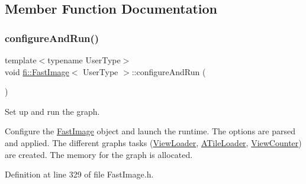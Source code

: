 \subsection{Member Function Documentation}
\mbox{\label{classfi_1_1FastImage_aa2ae5e5498f57462abd876108a55475c}} 
\subsubsection{\texorpdfstring{configure\+And\+Run()}{configureAndRun()}}
{\footnotesize\ttfamily template$<$typename User\+Type$>$ \\
void \hyperlink{classfi_1_1FastImage}{fi\+::\+Fast\+Image}$<$ User\+Type $>$\+::configure\+And\+Run (\begin{DoxyParamCaption}{ }\end{DoxyParamCaption})\hspace{0.3cm}{\ttfamily [inline]}}



Set up and run the graph. 

Configure the \hyperlink{classfi_1_1FastImage}{Fast\+Image} object and launch the runtime. The options are parsed and applied. The different graph\textquotesingle{}s tasks (\hyperlink{classfi_1_1ViewLoader}{View\+Loader}, \hyperlink{classfi_1_1ATileLoader}{A\+Tile\+Loader}, \hyperlink{classfi_1_1ViewCounter}{View\+Counter}) are created. The memory for the graph is allocated. 

Definition at line 329 of file Fast\+Image.\+h.

